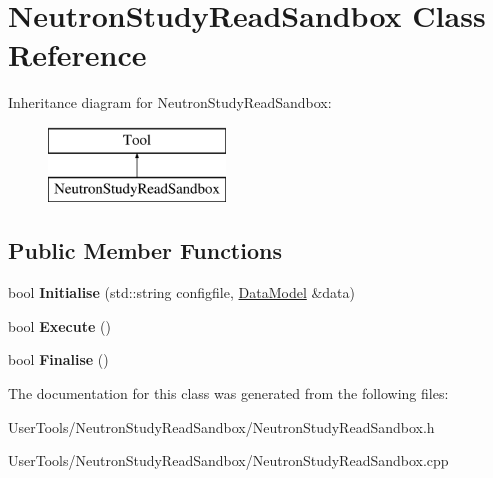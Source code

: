 \hypertarget{classNeutronStudyReadSandbox}{\section{Neutron\-Study\-Read\-Sandbox Class Reference}
\label{classNeutronStudyReadSandbox}
}
Inheritance diagram for Neutron\-Study\-Read\-Sandbox\-:\begin{figure}[H]
\begin{center}
\leavevmode
\includegraphics[height=2.000000cm]{classNeutronStudyReadSandbox}
\end{center}
\end{figure}
\subsection*{Public Member Functions}
\begin{DoxyCompactItemize}
\item 
\hypertarget{classNeutronStudyReadSandbox_a9e73e205358244c86e066bb28266066f}{bool {\bfseries Initialise} (std\-::string configfile, \hyperlink{classDataModel}{Data\-Model} \&data)}\label{classNeutronStudyReadSandbox_a9e73e205358244c86e066bb28266066f}

\item 
\hypertarget{classNeutronStudyReadSandbox_a580157d5a29b14c99e698f0919b65049}{bool {\bfseries Execute} ()}\label{classNeutronStudyReadSandbox_a580157d5a29b14c99e698f0919b65049}

\item 
\hypertarget{classNeutronStudyReadSandbox_af76eafb91eaf9270a9423e15026d8e20}{bool {\bfseries Finalise} ()}\label{classNeutronStudyReadSandbox_af76eafb91eaf9270a9423e15026d8e20}

\end{DoxyCompactItemize}


The documentation for this class was generated from the following files\-:\begin{DoxyCompactItemize}
\item 
User\-Tools/\-Neutron\-Study\-Read\-Sandbox/Neutron\-Study\-Read\-Sandbox.\-h\item 
User\-Tools/\-Neutron\-Study\-Read\-Sandbox/Neutron\-Study\-Read\-Sandbox.\-cpp\end{DoxyCompactItemize}
